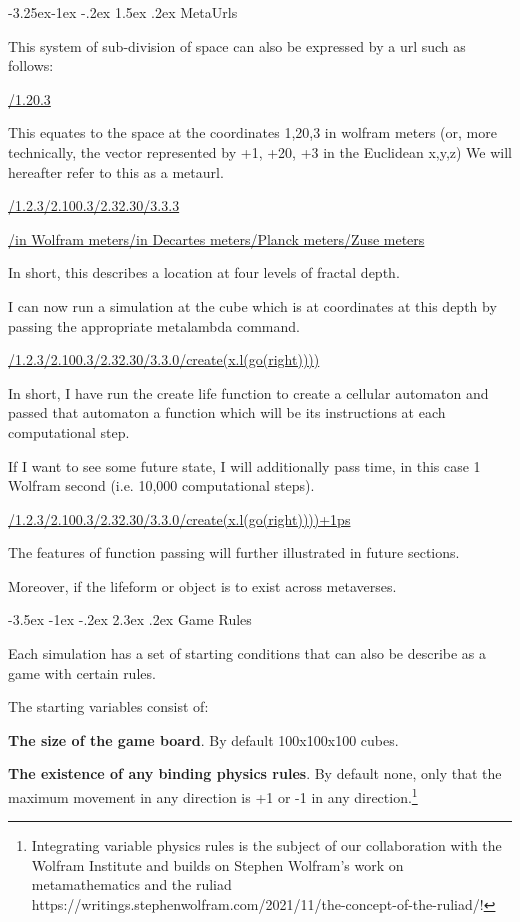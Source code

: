 \documentclass[11pt]{article}
\makeatletter
\renewcommand\section{\@startsection {section}{1}{\z@}%
                                       {-3.5ex \@plus -1ex \@minus -.2ex}%
                                       {2.3ex \@plus.2ex}%
                                       {\normalfont\fontfamily{phv}\fontsize{16}{19}\bfseries}}
\renewcommand\subsection{\@startsection{subsection}{2}{\z@}%
                                         {-3.25ex\@plus -1ex \@minus -.2ex}%
                                         {1.5ex \@plus .2ex}%
                                         {\normalfont\fontfamily{phv}\fontsize{14}{17}\bfseries}}
\makeatother
\begin{document}
\subsection{MetaUrls} \label{s:numerical}

This system of sub-division of space can also be expressed by a url such as follows: 

\url{/1.20.3}

This equates to the space at the coordinates 1,20,3 in wolfram meters (or, more technically, the vector represented by +1, +20, +3 in the Euclidean x,y,z) We will hereafter refer to this as a metaurl. 

\url{/1.2.3/2.100.3/2.32.30/3.3.3}

\url{/in Wolfram meters/in Decartes meters/Planck meters/Zuse meters}

In short, this describes a location at four levels of fractal depth. 

I can now run a simulation at the cube which is at coordinates at this depth by passing the appropriate metalambda command. 

\url{/1.2.3/2.100.3/2.32.30/3.3.0/create(x.l(go(right))))}


In short, I have run the create life function to create a cellular automaton and passed that automaton a function which will be its instructions at each computational step.    

If I want to see some future state, I will additionally pass time, in this case 1 Wolfram second (i.e. 10,000 computational steps). 

\url{/1.2.3/2.100.3/2.32.30/3.3.0/create(x.l(go(right))))+1ps} 

The features of function passing will further illustrated in future sections. 

Moreover, if the lifeform or object is to exist across metaverses. 

\section{Game Rules} \label{s:numerical}


Each simulation has a set of starting conditions that can also be describe as a game with certain rules.  

The starting variables consist of:

\textbf{The size of the game board}. By default 100x100x100 cubes.

\textbf{The existence of any binding physics rules}. By default none, only that the maximum movement in any direction is +1 or -1 in any direction.\footnote{Integrating variable physics rules is the subject of our collaboration with the Wolfram Institute and builds on Stephen Wolfram's work on metamathematics and the ruliad https://writings.stephenwolfram.com/2021/11/the-concept-of-the-ruliad/!}
\end{document}
